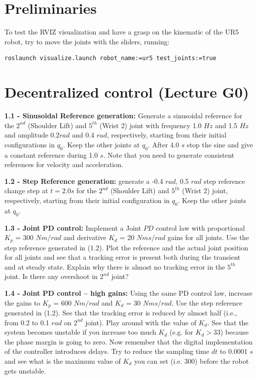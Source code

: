 \documentclass[11pt]{article}
\begin{document}
\section{Preliminaries}

To test the RVIZ visualization and have a grasp on the kinematic of the UR5 robot, try to move the joints with the sliders, running:
%
\begin{verbatim}
roslaunch visualize.launch robot_name:=ur5 test_joints:=true 
\end{verbatim}

\section{Decentralized control (Lecture G0)}

\noindent
\textbf{1.1 - Sinusoidal Reference generation:}
 Generate a sinusoidal reference for the $2^{nd}$ (Shoulder Lift) and $5^{th}$  (Wrist 2) joint with frequency 1.0 $Hz$ and 1.5 $Hz$ and amplitude 0.2$rad$ and 0.4 $rad$, respectively,  starting from their initial configurations in $q_0$. Keep the other joints at $q_0$. After 4.0 $s$ stop the sine and give a constant reference during  1.0 $s$. Note that you need to generate consistent references for velocity and acceleration.

\quad

\noindent
\textbf{1.2 - Step Reference generation:} generate a -0.4 $rad$, 0.5 $rad$ step reference change step at $t= 2.0s$ for the $2^{nd}$ (Shoulder Lift) and $5^{th}$  (Wrist 2) joint, respectively, starting from their initial configuration in $q_0$. Keep the other joints at $q_0$.

\quad

\noindent
\textbf{1.3 - Joint PD control:}
Implement a Joint $PD$ control law with proportional $K_p$ = 300 $Nm/rad$ and derivative $K_d$ = 20 $Nms/rad$ gains for all joints. Use the step reference generated in (1.2). Plot the reference and the actual joint position for all joints and see that a tracking error is present both during the transient and at steady state. Explain why there is almost no tracking error in the $5^{th}$ joint. %
Is there any overshoot in $2^{nd}$ joint? 

\quad

\noindent 
\textbf{1.4 - Joint PD control – high gains:}
Using the same PD control law, increase the gains to $K_p$ = 600 $Nm/rad$ and $K_d$ = 30 $Nms/rad$.  Use the step reference generated in (1.2). See that the tracking 
error is reduced by almost half (i.e., from 0.2 to 0.1 $rad$ on $2^{nd}$ joint). Play around with the value of $K_d$. See that the system becomes unstable if you 
increase too much $K_d$ (e.g. for $K_d>33$)  because the phase margin is going to zero. Now remember that the digital implementation of the controller introduces delays. Try to reduce the sampling time $dt$ to 0.0001 $s$ and see what is the maximum value of $K_d$ you can set (i.e. 300) before the robot gets unstable.
\end{document}
